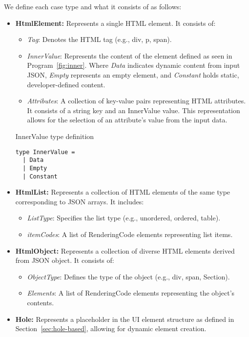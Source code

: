 We define each case type and what it consists of as follows:
\begin{itemize}
	\item \textbf{HtmlElement:} Represents a single HTML element. It consists of:
	      \begin{itemize}
		      \item \emph{Tag}: Denotes the HTML tag (e.g., div, p, span). \item \emph{InnerValue}: Represents the content of the element defined as seen in Program~\ref{fig:inner}.
		            Where \emph{Data} indicates dynamic content from input JSON, \emph{Empty} represents an empty element, and \emph{Constant} holds static, developer-defined content.
		      \item {\emph{Attributes}: A collection of key-value pairs representing HTML attributes.
		            It consists of a string key and an InnerValue value. This representation allows for the selection of an attribute's value from the input data.
		            }

	      \end{itemize}
	      \begin{listing}[htbp]
		      \caption{InnerValue type definition}
		      \label{fig:inner}
		      \begin{lstlisting}
type InnerValue =
  | Data 
  | Empty
  | Constant
                  \end{lstlisting}
	      \end{listing}

	\item \textbf{HtmlList:} Represents a collection of HTML elements of the same type corresponding to JSON arrays. It includes:
	      \begin{itemize}
		      \item \emph{ListType}: Specifies the list type (e.g., unordered, ordered, table).
		      \item \emph{itemCodes}: A list of RenderingCode elements representing list items.

	      \end{itemize}

	\item \textbf{HtmlObject:} Represents a collection of diverse HTML elements derived from JSON object. It consists of:
	      \begin{itemize}
		      \item \emph{ObjectType}: Defines the type of the object (e.g., div, span, Section).
		      \item \emph{Elements}: A list of RenderingCode elements representing the object's contents.
	      \end{itemize}

	\item {\textbf{Hole:} Represents a placeholder in the UI element structure as defined in Section~\ref{sec:hole-based}, allowing for dynamic element creation.
	      }
\end{itemize}


